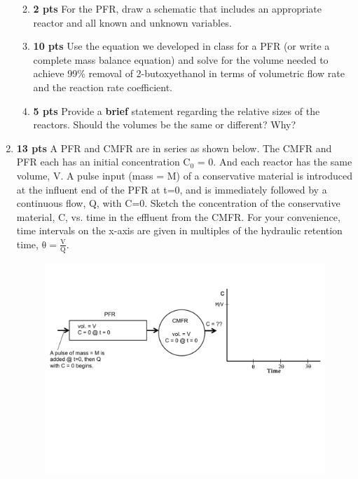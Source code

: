 \documentclass[12pt,letterpaper]{article}
\begin{document}
\begin{enumerate}
\begin{enumerate}
\vspace{4in}

\item \textbf{2 pts} For the PFR, draw a schematic that includes an appropriate reactor and all known and unknown variables.
\vspace{2in}

\item \textbf{10 pts} Use the equation we developed in class for a PFR (or write a complete mass balance equation) and solve for the volume needed to achieve 99\% removal of 2-butoxyethanol in terms of volumetric flow rate and the reaction rate coefficient.

\vspace{3in}


\item \textbf{5 pts} Provide a \textbf{brief} statement regarding the relative sizes of the reactors.  Should the volumes be the same or different?  Why?  

\pagebreak

\end{enumerate}

\item \textbf{13 pts}  A PFR and CMFR are in series as shown below.  The CMFR and PFR each has an initial concentration C$_0$ = 0.  And each reactor has the same volume, V.  A pulse input (mass = M) of a conservative material is introduced at the influent end of the PFR at t=0, and is immediately followed by a continuous flow, Q, with C=0. Sketch the concentration of the conservative material, C, vs. time in the effluent from the CMFR.   For your convenience, time intervals on the x-axis are given in multiples of the hydraulic retention time, $\mathrm{\theta = \frac{V}{Q}}$.

\begin{figure}
\centering
\includegraphics[width=1\textwidth]{pulse}
\end{figure}



\end{enumerate}
\end{document}
